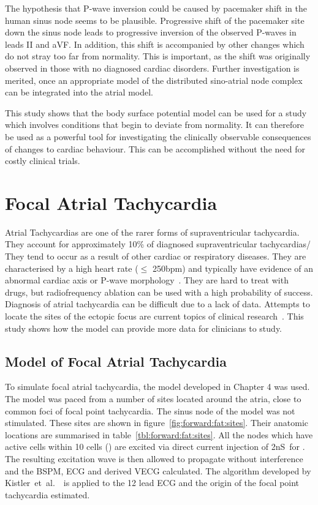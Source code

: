 The hypothesis that P-wave inversion could be caused by pacemaker shift in the
human sinus node seems to be plausible.
Progressive shift of the pacemaker site down the sinus node leads to progressive
inversion of the observed P-waves in leads II and aVF.
In addition, this shift is accompanied by other changes which do not stray too
far from normality.
This is important, as the shift was originally observed in those with no
diagnosed cardiac disorders.
Further investigation is merited, once an appropriate model of the distributed
sino-atrial node complex can be integrated into the atrial model.

This study shows that the body surface potential model can be used for a study
which involves conditions that begin to deviate from normality.
It can therefore be used as a powerful tool for investigating the clinically
observable consequences of changes to cardiac behaviour.
This can be accomplished without the need for costly clinical trials.



\section{Focal Atrial Tachycardia}

Atrial Tachycardias are one of the rarer forms of supraventricular
tachycardia.
They account for approximately 10\% of diagnosed supraventricular tachycardias/
They tend to occur as a result of other cardiac or respiratory diseases.
They are characterised by a high heart rate ($\leq$ \unit{250}{bpm}) and
typically have evidence of an abnormal cardiac axis or P-wave
morphology~\cite{MacFarlaneSinus1989}.
They are hard to treat with drugs, but radiofrequency ablation can be used with
a high probability of success.
Diagnosis of atrial tachycardia can be difficult due to a lack of data.
Attempts to locate the sites of the ectopic focus are current topics of clinical
research~\cite{Kistler2006,Kahn2006,Yamane2001}.
This study shows how the model can provide more data for clinicians to study.

\subsection{Model of Focal Atrial Tachycardia}

To simulate focal atrial tachycardia, the model developed in Chapter 4 was used.
The model was paced from a number of sites located around the atria, close to
common foci of focal point tachycardia.
The sinus node of the model was not stimulated.
These sites are shown in figure~\ref{fig:forward:fat:sites}.
Their anatomic locations are summarised in table~\ref{tbl:forward:fat:sites}.
All the nodes which have active cells within 10 cells () are excited via
direct current injection of \unit{2}{nS}\ for .
The resulting excitation wave is then allowed to propagate without interference
and the BSPM, ECG and derived VECG calculated.
The algorithm developed by Kistler~et~al.~\cite{Kistler2006}\ is applied to the
12 lead ECG and the origin of the focal point tachycardia estimated.

